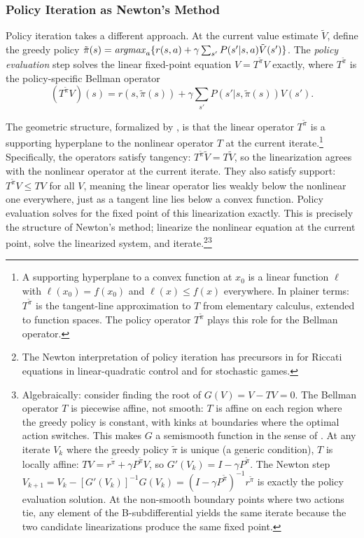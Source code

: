\subsubsection{Policy Iteration as Newton's Method}

Policy iteration takes a different approach. At the current value estimate $\tilde{V}$, define the greedy policy $\tilde{\pi}(s) = \mathop{\it argmax}_a \{ r(s,a) + \gamma \sum_{s'} P(s'|s,a) \tilde{V}(s') \}$. The \emph{policy evaluation} step solves the linear fixed-point equation $V = T^{\tilde{\pi}} V$ exactly, where $T^{\tilde{\pi}}$ is the policy-specific Bellman operator
\begin{equation}
(T^{\tilde{\pi}} V)(s) = r(s, \tilde{\pi}(s)) + \gamma \sum_{s'} P(s'|s,\tilde{\pi}(s)) V(s').
\end{equation}

The geometric structure, formalized by \citet{puterman1979}, is that the linear operator $T^{\tilde{\pi}}$ is a supporting hyperplane to the nonlinear operator $T$ at the current iterate.\footnote{A supporting hyperplane to a convex function at $x_0$ is a linear function $\ell$ with $\ell(x_0) = f(x_0)$ and $\ell(x) \leq f(x)$ everywhere. In plainer terms: $T^{\tilde{\pi}}$ is the tangent-line approximation to $T$ from elementary calculus, extended to function spaces. The policy operator $T^{\tilde{\pi}}$ plays this role for the Bellman operator.} Specifically, the operators satisfy tangency: $T^{\tilde{\pi}} \tilde{V} = T\tilde{V}$, so the linearization agrees with the nonlinear operator at the current iterate. They also satisfy support: $T^{\tilde{\pi}} V \leq TV$ for all $V$, meaning the linear operator lies weakly below the nonlinear one everywhere, just as a tangent line lies below a convex function. Policy evaluation solves for the fixed point of this linearization exactly. This is precisely the structure of Newton's method; linearize the nonlinear equation at the current point, solve the linearized system, and iterate.\footnote{The Newton interpretation of policy iteration has precursors in \citet{kleinman1968} for Riccati equations in linear-quadratic control and \citet{pollatschek1969} for stochastic games.}\footnote{Algebraically: consider finding the root of $G(V) = V - TV = 0$. The Bellman operator $T$ is piecewise affine, not smooth: $T$ is affine on each region where the greedy policy is constant, with kinks at boundaries where the optimal action switches. This makes $G$ a semismooth function in the sense of \citet{qi1993}. At any iterate $V_k$ where the greedy policy $\tilde{\pi}$ is unique (a generic condition), $T$ is locally affine: $TV = r^{\tilde{\pi}} + \gamma P^{\tilde{\pi}} V$, so $G'(V_k) = I - \gamma P^{\tilde{\pi}}$. The Newton step $V_{k+1} = V_k - [G'(V_k)]^{-1} G(V_k) = (I - \gamma P^{\tilde{\pi}})^{-1} r^{\tilde{\pi}}$ is exactly the policy evaluation solution. At the non-smooth boundary points where two actions tie, any element of the B-subdifferential yields the same iterate because the two candidate linearizations produce the same fixed point.}

